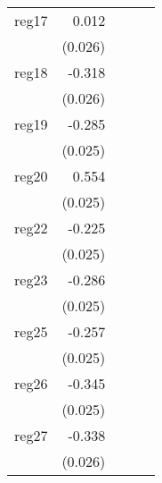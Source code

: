 {\begin{longtable}{l*{4}{D{.}{.}{-1}}}
\addlinespace
reg17       &       0.012         &                     &                     &                     \\
            &     (0.026)         &                     &                     &                     \\
\addlinespace
reg18       &      -0.318\sym{***}&                     &                     &                     \\
            &     (0.026)         &                     &                     &                     \\
\addlinespace
reg19       &      -0.285\sym{***}&                     &                     &                     \\
            &     (0.025)         &                     &                     &                     \\
\addlinespace
reg20       &       0.554\sym{***}&                     &                     &                     \\
            &     (0.025)         &                     &                     &                     \\
\addlinespace
reg22       &      -0.225\sym{***}&                     &                     &                     \\
            &     (0.025)         &                     &                     &                     \\
\addlinespace
reg23       &      -0.286\sym{***}&                     &                     &                     \\
            &     (0.025)         &                     &                     &                     \\
\addlinespace
reg25       &      -0.257\sym{***}&                     &                     &                     \\
            &     (0.025)         &                     &                     &                     \\
\addlinespace
reg26       &      -0.345\sym{***}&                     &                     &                     \\
            &     (0.025)         &                     &                     &                     \\
\addlinespace
reg27       &      -0.338\sym{***}&                     &                     &                     \\
            &     (0.026)         &                     &                     &                     \\

\end{longtable}}

